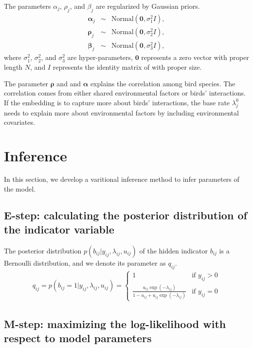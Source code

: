 \documentclass{article}
\newcommand{\wt}{\boldsymbol{\rho}}
\newcommand{\obswt}{\boldsymbol{\beta}}
\newcommand{\emb}{\boldsymbol{\alpha}}
\begin{document}
The parameters $\alpha_j$, $\rho_j$, and $\beta_j$ are regularized by Gaussian priors. 
\begin{eqnarray}
\emb_j &\sim& \mathrm{Normal}(\mathbf{0}, \sigma^2_1 I), \\
\wt_j &\sim& \mathrm{Normal}(\mathbf{0}, \sigma^2_2 I), \\
\obswt_j &\sim& \mathrm{Normal}(\mathbf{0}, \sigma^2_3 I),
\end{eqnarray}
where $\sigma_1^2$, $\sigma_2^2$, and $\sigma_3^2$ are hyper-parameters, $\mathbf{0}$ represents a zero vector with proper length $N$, and $I$ represents the identity matrix of with proper size. 

The parameter $\wt$ and and $\emb$ explains the correlation among bird species. The correlation comes from either shared environmental factors or birds' interactions. If the embedding is to capture more about birds' interactions, the base rate $\lambda^0_{j}$ needs to explain more about environmental factors by including environmental covariates. 

\section{Inference}

In this section, we develop a varitional inference method to infer parameters of the model. 

\subsection{ E-step: calculating the posterior distribution of the indicator variable}

The posterior distribution $p(b_{ij} | y_{ij}, \lambda_{ij}, u_{ij})$ of the hidden indicator $b_{ij}$ is a 
Bernoulli distribution, and we denote its parameter as $q_{ij}$.
\begin{eqnarray}
q_{ij} = p(b_{ij} = 1 | y_{ij}, \lambda_{ij}, u_{ij}) = \left\{ \begin{array}{ll} 
1 & \mbox{if } y_{ij} > 0\\
\frac{u_{ij}\exp(-\lambda_{ij})}{1 - u_{ij} + u_{ij}\exp(-\lambda_{ij})} & \mbox{if } y_{ij} = 0
\end{array}
\right. \label{estep_q}
\end{eqnarray}


\subsection{M-step: maximizing the log-likelihood with respect to model parameters}
\end{document}
